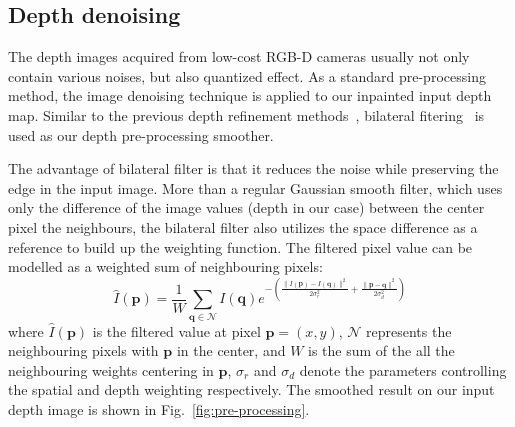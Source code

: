 \subsection{Depth denoising}
The depth images acquired from low-cost RGB-D cameras usually not only contain various noises, but also quantized effect.
As a standard pre-processing method, the image denoising technique is applied to our inpainted input depth map.
Similar to the previous depth refinement methods~\cite{zhang2012edge, or2015rgbd, han2013high, or2016real, haque2014high, yu2013shading}, bilateral fitering~\cite{tomasi1998bilateral} is used as our depth pre-processing smoother. 

The advantage of bilateral filter is that it reduces the noise while preserving the edge in the input image. 
More than a regular Gaussian smooth filter, which uses only the difference of the image values (depth in our case) between the center pixel the neighbours, the bilateral filter also utilizes the space difference as a reference to build up the weighting function.
The filtered pixel value can be modelled as a weighted sum of neighbouring pixels:
\begin{equation}
\hat{I}(\mathbf{p}) = \frac{1}{W}\sum_{\mathbf{q} \in \mathcal{N}} I(\mathbf{q})e^{-(\frac{\lVert I(\mathbf{p}) - I(\mathbf{q})\rVert^2}{2\sigma_r^2} + \frac{\lVert \mathbf{p} - \mathbf{q}\rVert^2}{2\sigma_d^2})}
\end{equation}
where $\hat{I}(\mathbf{p})$ is the filtered value at pixel $\mathbf{p} = (x,y)$, $\mathcal{N}$ represents the neighbouring pixels with $\mathbf{p}$ in the center, and $W$ is the sum of the all the neighbouring weights centering in $\mathbf{p}$, $\sigma_r$ and $\sigma_d$ denote the parameters controlling the spatial and depth weighting respectively. 
The smoothed result on our input depth image is shown in Fig.~\ref{fig:pre-processing}.

